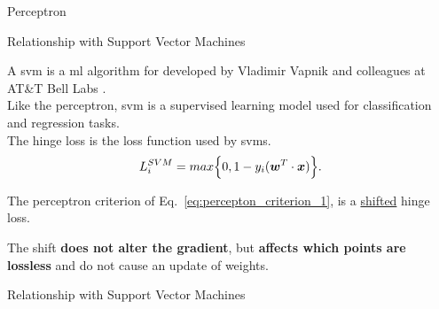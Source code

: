 %
%
%

\begin{frame}[t]{Perceptron}


\end{frame}

%
%
%

\begin{frame}[t]{Relationship with Support Vector Machines}

    A \gls{svm} is a \gls{ml} algorithm for  
    developed by Vladimir Vapnik and colleagues at AT\&T Bell Labs 
    \cite{Vapnik:1995svm}\cite{Wikipedia:SVM}.\\

    Like the \gls{perceptron}, \gls{svm}
    is a \gls{supervised learning} model 
    used for \gls{classification} 
    and \gls{regression} tasks.\\

    The \gls{hinge loss} is 
    the \gls{loss function}
    used by \glspl{svm}. 
    \begin{equation}
        L_{i}^{SVM} = 
          max\Big\{0, 1 - y_i(\boldsymbol{w}^T \cdot \boldsymbol{x}) \Big\}.
        \label{eq:hinge_loss_1}  
    \end{equation}

    The \gls{perceptron criterion} 
    of Eq.~\ref{eq:percepton_criterion_1}, is a \underline{shifted} \gls{hinge loss}.

    The shift {\bf does not alter the gradient}, 
    but {\bf affects which points are lossless} and do not cause an update of weights.

\end{frame}

%
%
%

\begin{frame}[t]{Relationship with Support Vector Machines}

\end{frame}
